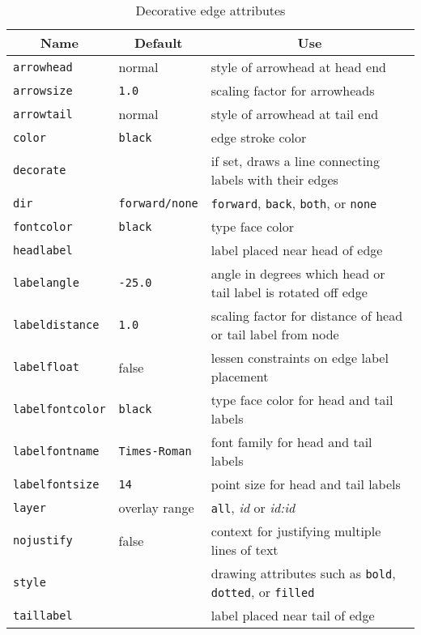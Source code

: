 \begin{table}[htbp]\footnotesize
\centering
\begin{tabular}[t]{|l|l|p{2.5in}|} \hline
\multicolumn{1}{|c|}{Name} & \multicolumn{1}{c|}{Default} & \multicolumn{1}{c|}{Use} \\ \hline
{\tt arrowhead} & normal & style of arrowhead at head end \\
{\tt arrowsize} & {\tt 1.0} & scaling factor for arrowheads \\
{\tt arrowtail} & normal & style of arrowhead at tail end \\
{\tt color} & {\tt black} & edge stroke color \\
{\tt decorate} & & if set, draws a line connecting labels with their edges \\
{\tt dir} & {\tt forward/none} & {\tt forward}, {\tt back}, {\tt both}, or {\tt none} \\ 
{\tt fontcolor} & {\tt black} & type face color \\
{\tt headlabel} & & label placed near head of edge \\
{\tt labelangle} & {\tt -25.0} & angle in degrees which head or tail label
is rotated off edge \\
{\tt labeldistance} & {\tt 1.0} & scaling factor for distance of head or tail label from node \\
{\tt labelfloat} & false & lessen constraints on edge label placement \\
{\tt labelfontcolor} & {\tt black} & type face color for head and tail labels\\
{\tt labelfontname} & {\tt Times-Roman} & font family for head and tail labels\\
{\tt labelfontsize} & {\tt 14} & point size for head and tail labels \\
{\tt layer} & overlay range & {\tt all}, {\it id} or {\it id:id} \\
{\tt nojustify} & false & context for justifying multiple lines of text \\
{\tt style} & & drawing attributes such as {\tt bold}, {\tt dotted}, or {\tt filled} \\ 
{\tt taillabel} & & label placed near tail of edge \\
\hline
\end{tabular}
\caption{Decorative edge attributes}
\label{tab:eattr_dec}
\end{table}
